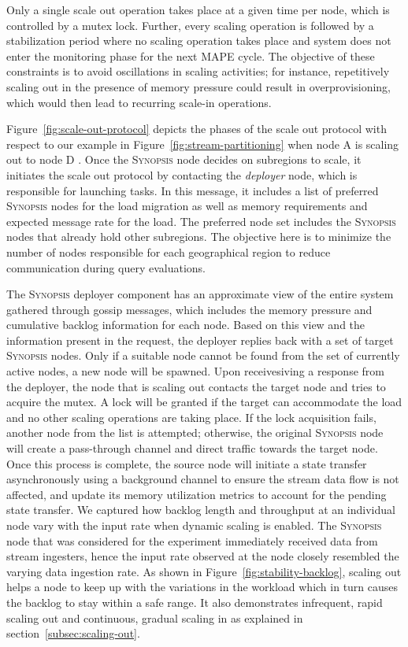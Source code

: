 Only a single scale out operation takes place at a given time per node, which is controlled by a mutex lock.
Further, every scaling operation is followed by a stabilization period where no scaling operation takes place and system does not enter the monitoring phase for the next MAPE cycle.
The objective of these constraints is to avoid oscillations in scaling activities; for instance, repetitively scaling out in the presence of memory pressure could result in overprovisioning, which would then lead to recurring scale-in operations.

Figure~\ref{fig:scale-out-protocol} depicts the phases of the scale out protocol with respect to our example in Figure~\ref{fig:stream-partitioning} when node A is scaling out to node D .
Once the \textsc{Synopsis} node decides on subregions to scale, it initiates the scale out protocol by contacting the \emph{deployer} node, which is responsible for launching tasks.
In this message, it includes a list of preferred \textsc{Synopsis} nodes for the load migration as well as memory requirements and expected message rate for the load.
The preferred node set includes the \textsc{Synopsis} nodes that already hold other subregions.
The objective here is to minimize the number of nodes responsible for each geographical region to reduce communication during query evaluations.

The \textsc{Synopsis} deployer component has an approximate view of the entire system gathered through gossip messages, which includes the memory pressure and cumulative backlog information for each node.
Based on this view and the information present in the request, the deployer replies back with a set of target \textsc{Synopsis} nodes.
Only if a suitable node cannot be found from the set of currently active nodes, a new node will be spawned.
Upon receivesiving a response from the deployer, the node that is scaling out contacts the target node and tries to acquire the mutex.
A lock will be granted if the target can accommodate the load and no other scaling operations are taking place.
If the lock acquisition fails, another node from the list is attempted; otherwise, the original \textsc{Synopsis} node will create a pass-through channel and direct traffic towards the target node.
Once this process is complete, the source node will initiate a state transfer asynchronously using a background channel to ensure the stream data flow is not affected, and update its memory utilization metrics to account for the pending state transfer.
We captured how backlog length and throughput at an individual node vary with the input rate when dynamic scaling is enabled.
The \textsc{Synopsis} node that was considered for the experiment immediately received data from stream ingesters, hence the input rate observed at the node closely resembled the varying data ingestion rate.
As shown in Figure~\ref{fig:stability-backlog}, scaling out helps a node to keep up with the variations in the workload which in turn causes the backlog to stay within a safe range.
It also demonstrates infrequent, rapid scaling out and continuous, gradual scaling in as explained in section~\ref{subsec:scaling-out}.

